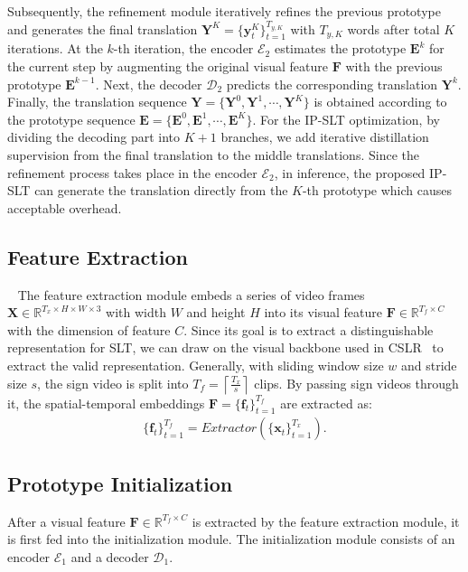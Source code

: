 \documentclass[10pt,twocolumn,letterpaper]{article}
\begin{document}
    Subsequently, the refinement module iteratively refines the previous prototype and generates the final translation $\bm{Y}^K=\{\bm{y}^K_t\}_{t=1}^{T_{y,K}}$ with $T_{y,K}$ words after total $K$ iterations.
    At the $k$-th iteration, the encoder $\mathcal{E}_2$ estimates the prototype $\bm{E}^k$ for the current step by augmenting the original visual feature $\bm{F}$ with the previous prototype $\bm{E}^{k-1}$. 
    Next, the decoder $\mathcal{D}_2$ predicts the corresponding translation $\bm{Y}^k$. 
    Finally, the translation sequence $\bm{Y}=\{\bm{Y}^0,\bm{Y}^1,\cdots,\bm{Y}^K\}$ is obtained according to the prototype sequence $\bm{E}=\{\bm{E}^0,\bm{E}^1,\cdots,\bm{E}^K\}$. For the IP-SLT optimization, by dividing the decoding part into $K+1$ branches, we add iterative distillation supervision from the final translation to the middle translations. Since the refinement process takes place in the encoder $\mathcal{E}_2$, in inference, the proposed IP-SLT can generate the translation directly from the $K$-th prototype which causes acceptable overhead.

    \subsection{Feature Extraction}~\label{Sec3.2}
    The feature extraction module embeds a series of video frames $\bm{X}\in\mathbb{R}^{T_x\times H\times W \times 3}$ with width $W$ and height $H$ into its visual feature $\bm{F}\in\mathbb{R}^{T_f\times C}$ with the dimension of feature $C$. Since its goal is to extract a distinguishable representation for SLT, we can draw on the visual backbone used in CSLR~\cite{cui2019deep, koller2016deep,koller2019weakly, cui2017recurrent} to extract the valid representation. 
    Generally, with sliding window size $w$ and stride size $s$, the sign video is split into $T_f=\left \lceil \frac{T_x}{s}  \right \rceil $ clips. By passing sign videos through it, the spatial-temporal embeddings $\bm{F}=\{\bm{f}_t\}_{t=1}^{T_f}$ are extracted as:
    \begin{equation}
    \begin{aligned}
    \label{equ:1}
    \{\bm{f}_t\}_{t=1}^{T_f}=Extractor(\{\bm{x}_t\}_{t=1}^{T_x}).
    \end{aligned}
    \end{equation}
    
    \subsection{Prototype Initialization} 
    After a visual feature $\bm{F}\in\mathbb{R}^{T_f\times C}$ is extracted by the feature extraction module, it is first fed into the initialization module. The initialization module consists of an encoder $\mathcal{E}_1$ and a decoder $\mathcal{D}_1$.
\end{document}
